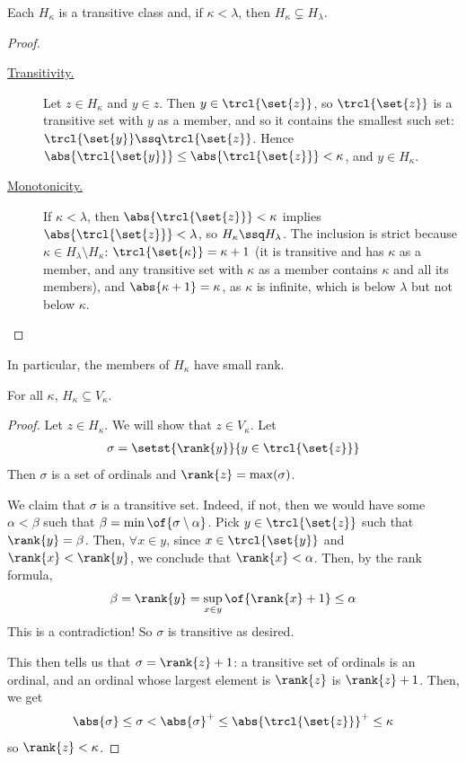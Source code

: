 \begin{boxlemma}
    Each $H_{\kappa}$ is a transitive class and, if $\kappa < \lambda$, then $H_{\kappa} \subsetneq H_{\lambda}$.
\end{boxlemma}
\begin{proof}
    \hfill
    \begin{description}
        \item[\underline{Transitivity.}] Let $z \in H_{\kappa}$ and $y \in z$. Then $y \in \trcl{\set{z}}$, so $\trcl{\set{z}}$ is a transitive set with $y$ as a member, and so it contains the smallest such set: $\trcl{\set{y}} \ssq \trcl{\set{z}}$. Hence $\abs{\trcl{\set{y}}} \leq \abs{\trcl{\set{z}}} < \kappa$, and $y \in H_{\kappa}$.

        \item[\underline{Monotonicity.}] If $\kappa < \lambda$, then $\abs{\trcl{\set{z}}} < \kappa$ implies $\abs{\trcl{\set{z}}} < \lambda$, so $H_{\kappa} \ssq H_{\lambda}$. The inclusion is strict because $\kappa \in H_{\lambda} \setminus H_{\kappa}$: $\trcl{\set{\kappa}} = \kappa + 1$ (it is transitive and has $\kappa$ as a member, and any transitive set with $\kappa$ as a member contains $\kappa$ and all its members), and $\abs{\kappa + 1} = \kappa$, as $\kappa$ is infinite, which is below $\lambda$ but not below $\kappa$.
    \end{description}
\end{proof}

In particular, the members of $H_{\kappa}$ have small rank.

\begin{boxlemma}
    For all $\kappa$, $H_{\kappa} \subseteq V_{\kappa}$.
\end{boxlemma}
\begin{proof}
    Let $z \in H_{\kappa}$. We will show that $z \in V_{\kappa}$. Let
    \begin{align*}
        \sigma = \setst{\rank{y}}{y \in \trcl{\set{z}}}
    \end{align*}
    Then $\sigma$ is a set of ordinals and $\rank{z} = \max(\sigma)$.

    We claim that $\sigma$ is a transitive set. Indeed, if not, then we would have some $\alpha < \beta$ such that $\beta = \min\of{\sigma \setminus \alpha}$. Pick $y \in \trcl{\set{z}}$ such that $\rank{y} = \beta$. Then, $\forall x \in y$, since $x \in \trcl{\set{y}}$ and $\rank{x} < \rank{y}$, we conclude that $\rank{x} < \alpha$. Then, by the rank formula,
    \begin{align*}
        \beta = \rank{y} = \sup_{x \in y}\of{\rank{x} + 1} \leq \alpha
    \end{align*}
    This is a contradiction! So $\sigma$ is transitive as desired.

    This then tells us that $\sigma = \rank{z} + 1$: a transitive set of ordinals is an ordinal, and an ordinal whose largest element is $\rank{z}$ is $\rank{z} + 1$.
    Then, we get
    \begin{align*}
        \abs{\sigma} \leq \sigma < \abs{\sigma}^+ \leq \abs{\trcl{\set{z}}}^+ \leq \kappa
    \end{align*}
    so $\rank{z} < \kappa$.
\end{proof}

